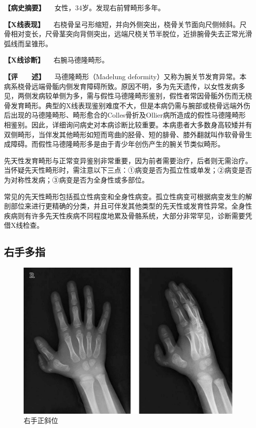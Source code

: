 \textbf{【病史摘要】} 　女性，34岁。发现右前臂畸形多年。

\textbf{【X线表现】}
　右桡骨呈弓形缩短，并向外侧突出，桡骨关节面向尺侧倾斜。尺骨相对变长，尺骨茎突向背侧突出，远端尺桡关节半脱位，近排腕骨失去正常光滑弧线而呈锥形。

\textbf{【X线诊断】} 　右腕马德隆畸形。

\textbf{【评　　述】} 　马德隆畸形（Madelung
deformity）又称为腕关节发育异常。本病系桡骨远端骨骺内侧发育障碍所致。原因不明，多为先天遗传，以女性发病多见，两侧发病较单侧为多，需与假性马德隆畸形鉴别，假性者常因骨骺外伤而无桡骨发育畸形。典型的X线表现鉴别难度不大，但是本病仍需与腕部或桡骨远端外伤后出现的马德隆畸形、畸形愈合的Colles骨折及Ollier病所造成的假性马德隆畸形相鉴别。因此，详细询问病史对本病诊断比较重要。本病患者大多数身高较矮并有双侧畸形，当伴发其他畸形如短而弯曲的胫骨、短的腓骨、膝外翻就叫作软骨骨生成障碍。而假性马德隆畸形多是由于青少年创伤产生的腕关节类似畸形。

先天性发育畸形与正常变异鉴别非常重要，因为前者需要治疗，后者则无需治疗。当怀疑先天性畸形时，需注意以下三点：①病变是否为孤立性或单发；②病变是否为对称性发病；③病变是否为全身性或多部位。

常见的先天性畸形包括孤立性病变和全身性病变。孤立性病变可根据病变发生的解剖部位来进行更精确的分类，并且可伴发其他类型的先天性或发育性异常。全身性疾病则有许多先天性疾病不同程度地累及骨骼系统，大部分非常罕见，诊断需要凭借X线检查。

\subsection{右手多指}

\begin{figure}[!htbp]
 \centering
 \includegraphics{./images/Image00024.jpg}
 \captionsetup{justification=centering}
 \caption{右手正斜位}
 \label{fig2-2-7}
  \end{figure} 

